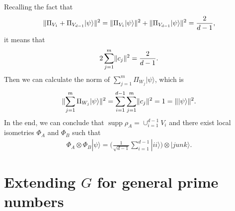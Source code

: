 \documentclass[11pt,letterpaper]{article}
\newcommand{\ket}[1]{|#1\rangle}
\newcommand{\ketbra}[2]{|#1\rangle\langle#2|}
\newcommand{\x}{\otimes}
\DeclarePairedDelimiter{\norm}{\lVert}{\rVert}
\DeclareMathOperator{\Tr}{Tr}
\DeclareMathOperator{\supp}{supp}
\newcommand{\1}{\mathbb{1}}
\newcommand{\CHSH}{CHSH^{(d)}}
\newcommand{\SVT}{SVT}
\newcommand{\G}{G}
\newcommand{\tA}{\tilde{A}}
\theoremstyle{definition}
\begin{document}
Recalling the fact that 
\begin{align}
\norm{ \Pi_{V_1} + \Pi_{V_{d-1}} \ket{\psi}}^2 = \norm{\Pi_{V_1} \ket{\psi}}^2 + \norm{\Pi_{V_{d-1}} \ket{\psi}}^2 = \frac{2}{d-1},
 \end{align}
 it means that 
 \begin{align}
 	2 \sum_{j=1}^m \norm{c_j}^2 = \frac{2}{d-1}.
 \end{align}
 Then we can calculate the norm of $\sum_{j =1}^m \Pi_{W_j} \ket{\psi}$, which is
 \begin{align}
 \norm{\sum_{j =1}^m \Pi_{W_j} \ket{\psi}}^2 = \sum_{i=1}^{d-1} \sum_{j=1}^m \norm{c_j}^2 = 1 = \norm{\ket{\psi}}^2.
 \end{align}
 In the end, we can conclude that $\supp{\rho_A} = \cup_{i=1}^{d-1} V_i$ and there exist local isometries $\Phi_A$ and $\Phi_B$
 such that 
 \begin{align}
 	\Phi_A\x\Phi_B  \ket{\psi} =  (\frac{1}{\sqrt{d-1}} \sum_{i=1}^{d-1} \ket{ii}) \x \ket{junk}.
 \end{align}
 
\section{Extending $\G$ for general prime numbers }
\label{sec:extend}





\appendix
\end{document}
